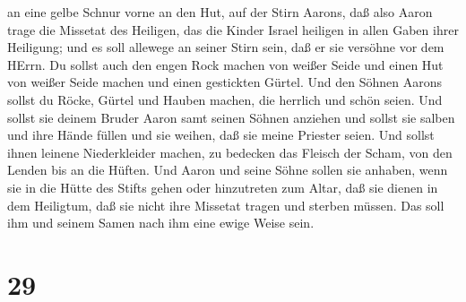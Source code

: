 an eine gelbe Schnur vorne an den Hut,  auf der Stirn
Aarons, daß also Aaron trage die Missetat des Heiligen, das die Kinder
Israel heiligen in allen Gaben ihrer Heiligung; und es soll allewege an
seiner Stirn sein, daß er sie versöhne vor dem HErrn.  Du
sollst auch den engen Rock machen von weißer Seide und einen Hut von
weißer Seide machen und einen gestickten Gürtel.  Und den
Söhnen Aarons sollst du Röcke, Gürtel und Hauben machen, die herrlich
und schön seien.  Und sollst sie deinem Bruder Aaron samt
seinen Söhnen anziehen und sollst sie salben und ihre Hände füllen und
sie weihen, daß sie meine Priester seien.  Und sollst ihnen
leinene Niederkleider machen, zu bedecken das Fleisch der Scham, von den
Lenden bis an die Hüften.  Und Aaron und seine Söhne sollen
sie anhaben, wenn sie in die Hütte des Stifts gehen oder hinzutreten zum
Altar, daß sie dienen in dem Heiligtum, daß sie nicht ihre Missetat
tragen und sterben müssen. Das soll ihm und seinem Samen nach ihm eine
ewige Weise sein.

\hypertarget{section-28}{%
\section{29}\label{section-28}}

